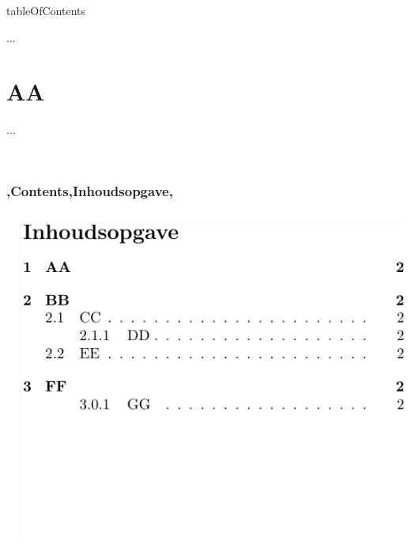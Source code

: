 
\begin{saveblock}{tableOfContents}
    \begin{highlightblock}[linewidth=0.5\textwidth,gobble=8]
        ...
        \usepackage[dutch]{babel}
        
        
            \maketitle
            \tableofcontents
            \newpage
            
            \section{AA}
            ...
        
        ~~
        ~~
        ~~
        ~~
    \end{highlightblock}
\end{saveblock}


\begin{frame}
    \frametitle{\lang,Contents,Inhoudsopgave,}
    
    \begin{columns}
        \begin{column}{0.5\textwidth}
        \end{column}
        \begin{column}{0.5\textwidth}
            \includegraphics[width=\linewidth,height=0.8\textheight,keepaspectratio,page=1]{assets/tableofcontentsdutch.pdf}
        \end{column}
    \end{columns}
\end{frame}

